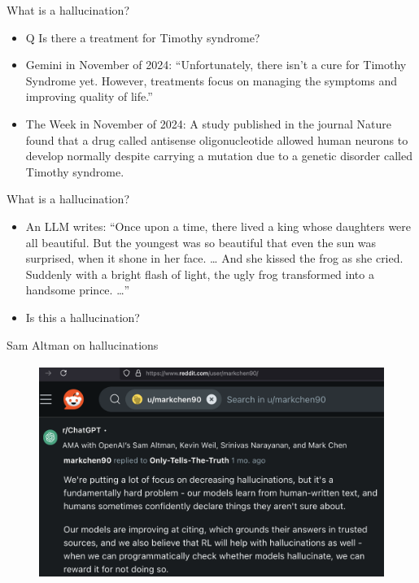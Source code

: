 \begin{vbframe}{What is a hallucination?}

\vfill


	\begin{itemize}


\item Q Is there a treatment for Timothy syndrome?
\item Gemini in November of 2024:
``Unfortunately, there isn't a cure for Timothy Syndrome
yet. However, treatments focus on managing the symptoms and
improving quality of life.''
\item The Week in November of 2024:
A study published in the journal Nature found that a drug
called antisense oligonucleotide allowed human neurons to
develop normally despite carrying a mutation due to a
genetic disorder called Timothy syndrome.
\end{itemize}


\vfill

\end{vbframe}


\begin{vbframe}{What is a hallucination?}

\vfill


	\begin{itemize}


\item An LLM writes:
``Once upon a time, there
lived a king whose daughters
were all beautiful. But the
youngest was so beautiful
that even the sun was
surprised, when it shone in
her face. \ldots
 And she kissed the frog as she cried.
       Suddenly with a bright flash of light, the ugly frog
       transformed into a handsome prince.
       \ldots''
       
\item \ques Is this a hallucination?
\end{itemize}

\vfill

\end{vbframe}



\begin{vbframe}{Sam Altman on hallucinations}
\begin{figure}
\centering
\includegraphics[height = 7cm]{figure/altman,halluciation}
\end{figure}
\vfill
\end{vbframe}


